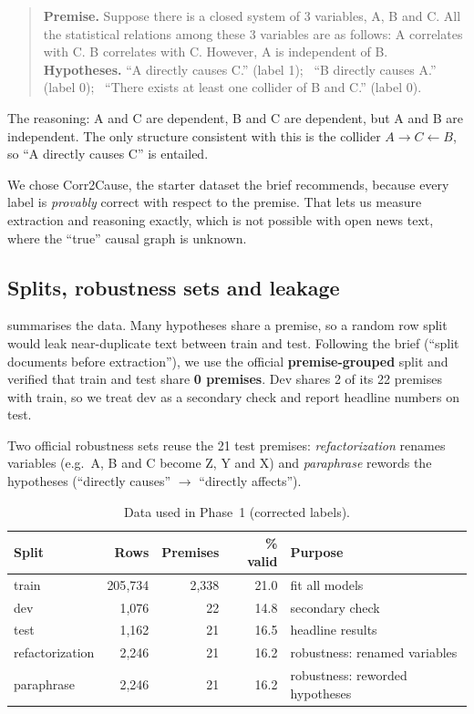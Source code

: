 \documentclass[12pt,a4paper]{article}
\newcommand{\thead}[1]{\textbf{#1}}
\newenvironment{examplebox}{\begin{quote}}{\end{quote}}
\begin{document}
\begin{examplebox}
\small\textbf{Premise.} Suppose there is a closed system of 3 variables, A, B and C. All the statistical relations
among these 3 variables are as follows: A correlates with C. B correlates with C. However, A is independent of B.\\[0.3em]
\textbf{Hypotheses.} ``A directly causes C.'' (label 1); \ ``B directly causes A.'' (label 0); \
``There exists at least one collider of B and C.'' (label 0).
\end{examplebox}

The reasoning: A and C are dependent, B and C are dependent, but A and B are independent. The only structure
consistent with this is the collider $A\rightarrow C\leftarrow B$, so ``A directly causes C'' is entailed.

We chose Corr2Cause, the starter dataset the brief recommends, because every label is
\emph{provably} correct with respect to the premise. That lets us measure extraction and reasoning exactly,
which is not possible with open news text, where the ``true'' causal graph is unknown.

\subsection{Splits, robustness sets and leakage}
 summarises the data. Many hypotheses share a premise, so a random row split would leak
near-duplicate text between train and test. Following the brief (``split documents before extraction''), we
use the official \textbf{premise-grouped} split and verified that train and test share \textbf{0 premises}.
Dev shares 2 of its 22 premises with train, so we treat dev as a secondary check and report headline numbers on test.

Two official robustness sets reuse the 21 test premises: \emph{refactorization} renames variables
(e.g.\ A, B and C become Z, Y and X) and \emph{paraphrase} rewords the hypotheses
(``directly causes'' $\rightarrow$ ``directly affects'').

\begin{table}[!htbp]
\centering\small
\caption{Data used in Phase~1 (corrected labels).}
\label{tab:splits}
\begin{tabular}{@{}lrrrl@{}}
\toprule
\thead{Split} & \thead{Rows} & \thead{Premises} & \thead{\% valid} & \thead{Purpose} \\
\midrule
train            & 205{,}734 & 2{,}338 & 21.0 & fit all models \\
\rowcolor{rowtint} dev & 1{,}076 & 22 & 14.8 & secondary check \\
test             & 1{,}162 & 21 & 16.5 & headline results \\
\rowcolor{rowtint} refactorization & 2{,}246 & 21 & 16.2 & robustness: renamed variables \\
paraphrase       & 2{,}246 & 21 & 16.2 & robustness: reworded hypotheses \\
\bottomrule
\end{tabular}
\end{table}
\end{document}

